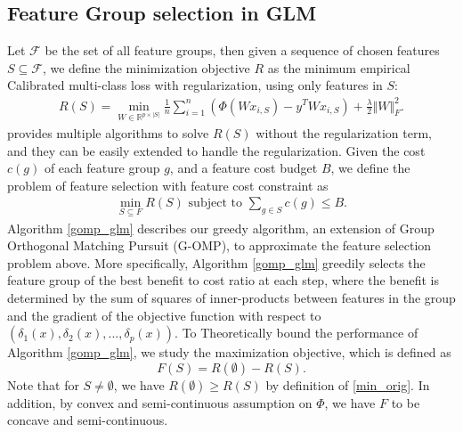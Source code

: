 \subsection{Feature Group selection in GLM}
Let $\mathcal{F}$ be the set of all feature groups, then 
given a sequence of chosen features $S \subseteq \mathcal{F}$,
we define the minimization objective $R$ as the 
minimum empirical Calibrated multi-class loss
with regularization, using only features in $S$:
\begin{align}
  R(S) = \min _{W \in \mathbb{R}^{p \times |S|}} 
    \frac{1}{n} \sum _{i=1}^n (\Phi(Wx_{i,S}) - y^TWx_{i,S}) 
    + \frac{\lambda}{2} \Vert W \Vert _F^2.
  \label{min_orig}
\end{align}
\cite{least_square_revisited} provides multiple algorithms to solve $R(S)$ 
without the regularization term, and they 
can be easily extended to handle the regularization. 
Given the cost $c(g)$ of each feature group $g$, 
and a feature cost budget $B$, 
we define the problem of feature selection with feature cost constraint as
\begin{align}
  \min _{S \subseteq F} R(S) \text{ subject to } \sum _{ g \in S } c(g) \leq B.
\end{align}
Algorithm \ref{gomp_glm} describes our greedy algorithm, an extension of 
Group Orthogonal Matching Pursuit (G-OMP), to approximate the feature selection problem above.
More specifically, Algorithm \ref{gomp_glm} greedily selects the feature group of the best benefit to cost ratio at 
each step, where the benefit is determined by the sum of squares of inner-products between 
features in the group
and the gradient of the objective function with respect to $(\delta_1(x), \delta_2(x), ... , \delta_p(x))$. 
To Theoretically bound the performance of Algorithm \ref{gomp_glm}, we study the maximization 
objective, which is defined as 
\begin{equation}
  F(S) = R(\emptyset) - R(S).
\end{equation}
Note that for $S \neq \emptyset$, we have $R(\emptyset) \geq R(S)$ by definition of \ref{min_orig}.
In addition, by convex and semi-continuous assumption on $\Phi$, we have $F$ to be concave and semi-continuous.

